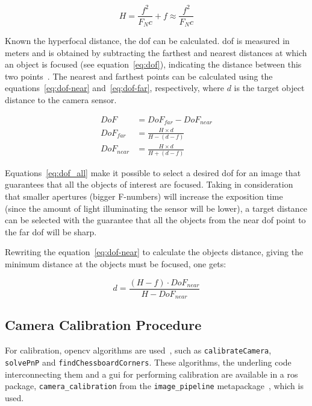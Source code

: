 \begin{equation}
	\label{eq:hyperfocal_distance}
	H = \frac{f^2}{F_Nc} + f \approx \frac{f^2}{F_Nc} 
\end{equation}

Known the hyperfocal distance, the \acf{dof} can be calculated. \ac{dof} is measured in meters and is obtained by subtracting the farthest and nearest distances at which an object is focused (see equation~\ref{eq:dof}), indicating the distance between this two points~\cite{Photopillers, Merklinger1993, mvg_book}. The nearest and farthest points can be calculated using the equations~\ref{eq:dof-near} and~\ref{eq:dof-far}, respectively, where $d$ is the target object distance to the camera sensor.

\begin{subequations}
	\label{eq:dof_all}
	\begin{align}
		DoF & = DoF_{far} - DoF_{near} \label{eq:dof} \\
		DoF_{far} & = \frac{H\times d}{H - (d - f)} \label{eq:dof-far} \\
		DoF_{near} & = \frac{H\times d}{H + (d - f)} \label{eq:dof-near} 
	\end{align}
\end{subequations}

Equations~\ref{eq:dof_all} make it possible to select a desired \acl{dof} for an image that guarantees that all the objects of interest are focused. Taking in consideration that smaller apertures (bigger F-numbers) will increase the exposition time~\cite{Merklinger1993} (since the amount of light illuminating the sensor will be lower), a target distance can be selected with the guarantee that all the objects from the near \ac{dof} point to the far \ac{dof} will be sharp.

Rewriting the equation~\ref{eq:dof-near} to calculate the objects distance, giving the minimum distance at the objects must be focused, one gets: %

\begin{equation}
	\label{eq:dof-subject-distance}
	d = \frac{(H - f) \cdot DoF_{near}}{H - DoF_{near}}
\end{equation}


\subsection{Camera Calibration Procedure}
For calibration, \ac{opencv} algorithms are used~\cite{opencv_doc}, such as \texttt{calibrateCamera}, \texttt{solvePnP} and \texttt{findChessboardCorners}. These algorithms, the underling code interconnecting them and a \ac{gui} for performing calibration are available in a \ac{ros} package, \texttt{camera\_calibration} from the \texttt{image\_pipeline} metapackage~\cite{cameraCalibrationRos}, which is used.


